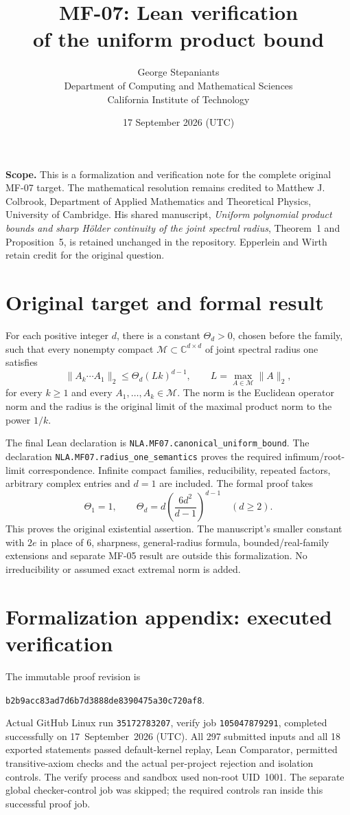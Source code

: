 \documentclass[11pt,a4paper]{article}
\title{\textbf{MF-07: Lean verification\\of the uniform product bound}}
\author{George Stepaniants\\[3pt]\small Department of Computing and Mathematical Sciences\\\small California Institute of Technology}
\date{17 September 2026 (UTC)}
\begin{document}
\maketitle
\textbf{Scope.} This is a formalization and verification note for the complete
original MF-07 target. The mathematical resolution remains credited to
Matthew J. Colbrook, Department of Applied Mathematics and Theoretical Physics,
University of Cambridge. His shared manuscript, \emph{Uniform polynomial
product bounds and sharp H\"older continuity of the joint spectral radius},
Theorem~1 and Proposition~5, is retained unchanged in the repository.
Epperlein and Wirth retain credit for the original question.

\section*{Original target and formal result}
For each positive integer $d$, there is a constant $\Theta_d>0$, chosen before
the family, such that every nonempty compact
$\mathcal M\subset\mathbb C^{d\times d}$ of joint spectral radius one satisfies
\[
 \|A_k\cdots A_1\|_2\le\Theta_d(Lk)^{d-1},\qquad
 L=\max_{A\in\mathcal M}\|A\|_2,
\]
for every $k\ge1$ and every $A_1,\ldots,A_k\in\mathcal M$.
The norm is the Euclidean operator norm and the radius is the original limit
of the maximal product norm to the power $1/k$.

The final Lean declaration is
\texttt{NLA.MF07.canonical\_uniform\_bound}.
The declaration \texttt{NLA.MF07.radius\_one\_semantics} proves the required
infimum/root-limit correspondence. Infinite compact families, reducibility,
repeated factors, arbitrary complex entries and $d=1$ are included.
The formal proof takes
\[
 \Theta_1=1,\qquad
 \Theta_d=d\left(\frac{6d^2}{d-1}\right)^{d-1}\quad(d\ge2).
\]
This proves the original existential assertion. The manuscript's smaller
constant with $2e$ in place of $6$, sharpness, general-radius formula,
bounded/real-family extensions and separate MF-05 result are outside this
formalization. No irreducibility or assumed exact extremal norm is added.

\section*{Formalization appendix: executed verification}
The immutable proof revision is
\begin{center}\small
\texttt{b2b9acc83ad7d6b7d3888de8390475a30c720af8}.
\end{center}
Actual GitHub Linux run \texttt{35172783207}, verify job
\texttt{105047879291}, completed successfully on 17~September~2026 (UTC).
All 297 submitted inputs and all 18 exported statements passed default-kernel
replay, Lean Comparator, permitted transitive-axiom checks and the actual
per-project rejection and isolation controls. The verify process and sandbox
used non-root UID~1001. The separate global checker-control job was skipped;
the required controls ran inside this successful proof job.
\end{document}
